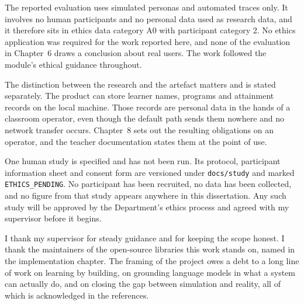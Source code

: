\documentclass[11pt,a4paper]{report}
\newif\ifhumanfeedback
\newcommand{\ethicsroutenote}{The questionnaire and its inclusion in this report were agreed with my supervisor.}
\begin{document}
\ifhumanfeedback
The evaluation combines simulated personas and automated traces with one short anonymous questionnaire completed by adult volunteers, reported in Section~\ref{sec:volunteerfeedback}. The questionnaire collected no name, email address or any other personal data, required no sign-in, and carried its consent statement on the face of the form; no conclusion about real users in general is drawn from it. \ethicsroutenote{} The synthetic personas remain language-model constructs, labelled as such at every point of use, and none of the evaluation in Chapter~6 draws a conclusion about real users beyond that questionnaire's stated limits. The synthetic and automated evaluation continues to sit in data category A0 with participant category 2. The work followed the module's ethical guidance throughout.
\else
The reported evaluation uses simulated personas and automated traces only. It involves no human participants and no personal data used as research data, and it therefore sits in ethics data category A0 with participant category 2. No ethics application was required for the work reported here, and none of the evaluation in Chapter~6 draws a conclusion about real users. The work followed the module's ethical guidance throughout.
\fi

The distinction between the research and the artefact matters and is stated separately. The product can store learner names, programs and attainment records on the local machine. Those records are personal data in the hands of a classroom operator, even though the default path sends them nowhere and no network transfer occurs. Chapter~8 sets out the resulting obligations on an operator, and the teacher documentation states them at the point of use.

One human study is specified and has not been run. Its protocol, participant information sheet and consent form are versioned under \texttt{docs/study} and marked \texttt{ETHICS\_PENDING}. No participant has been recruited, no data has been collected, and no figure from that study appears anywhere in this dissertation. Any such study will be approved by the Department's ethics process and agreed with my supervisor before it begins.

I thank my supervisor for steady guidance and for keeping the scope honest. I thank the maintainers of the open-source libraries this work stands on, named in the implementation chapter. The framing of the project owes a debt to a long line of work on learning by building, on grounding language models in what a system can actually do, and on closing the gap between simulation and reality, all of which is acknowledged in the references.
\end{document}
